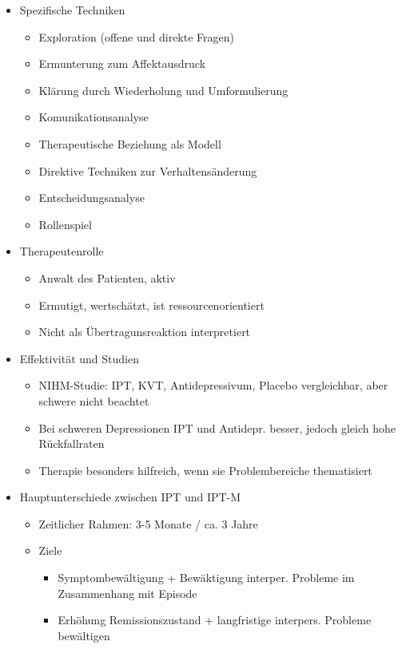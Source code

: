 \documentclass[11pt, paper=a4, twocolumn]{scrartcl}
\begin{document}
\begin{itemize}
\begin{itemize}
				\end{itemize}
			\item Spezifische Techniken
				\begin{itemize}
					\item Exploration (offene und direkte Fragen)
					\item Ermunterung zum Affektausdruck
					\item Klärung durch Wiederholung und Umformulierung
					\item Komunikationsanalyse
					\item Therapeutische Beziehung als Modell
					\item Direktive Techniken zur Verhaltensänderung
					\item Entscheidungsanalyse
					\item Rollenspiel
				\end{itemize}
			\item Therapeutenrolle
				\begin{itemize}
					\item Anwalt des Patienten, aktiv
					\item Ermutigt, wertschätzt, ist ressourcenorientiert
					\item Nicht als Übertragunsreaktion interpretiert
				\end{itemize}
			\item Effektivität und Studien
				\begin{itemize}
					\item NIHM-Studie: IPT, KVT, Antidepressivum, Placebo vergleichbar, aber schwere nicht beachtet
					\item Bei schweren Depressionen IPT und Antidepr. besser, jedoch gleich hohe Rückfallraten
					\item Therapie besonders hilfreich, wenn sie Problembereiche thematisiert
				\end{itemize}
			\item Hauptunterschiede zwischen IPT und IPT-M
				\begin{itemize}
					\item Zeitlicher Rahmen: 3-5 Monate / ca. 3 Jahre
					\item Ziele
						\begin{itemize}
							\item Symptombewältigung + Bewäktigung interper. Probleme im Zusammenhang mit Episode
							\item Erhöhung Remissionszustand + langfristige interpers. Probleme bewältigen
						\end{itemize}

\end{itemize}
\end{itemize}
\end{document}
